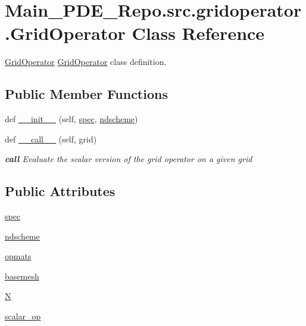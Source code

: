 \hypertarget{classMain__PDE__Repo_1_1src_1_1gridoperator_1_1GridOperator}{}\section{Main\+\_\+\+P\+D\+E\+\_\+\+Repo.\+src.\+gridoperator.\+Grid\+Operator Class Reference}
\label{classMain__PDE__Repo_1_1src_1_1gridoperator_1_1GridOperator}


\hyperlink{classMain__PDE__Repo_1_1src_1_1gridoperator_1_1GridOperator}{Grid\+Operator} \hyperlink{classMain__PDE__Repo_1_1src_1_1gridoperator_1_1GridOperator}{Grid\+Operator} class definition.  


\subsection*{Public Member Functions}
\begin{DoxyCompactItemize}
\item 
def \hyperlink{classMain__PDE__Repo_1_1src_1_1gridoperator_1_1GridOperator_a874aaa760371b08e21431b13fd615dfc}{\+\_\+\+\_\+init\+\_\+\+\_\+} (self, \hyperlink{classMain__PDE__Repo_1_1src_1_1gridoperator_1_1GridOperator_a4fb567c3ca465539b3a726f7532dc0ee}{spec}, \hyperlink{classMain__PDE__Repo_1_1src_1_1gridoperator_1_1GridOperator_aa6270af360bec9b3331951328b48a724}{ndscheme})
\item 
def \hyperlink{classMain__PDE__Repo_1_1src_1_1gridoperator_1_1GridOperator_a9794669e62dbcafb6ecd7e687a5e75b5}{\+\_\+\+\_\+call\+\_\+\+\_\+} (self, grid)
\begin{DoxyCompactList}\small\item\em {\bfseries call} Evaluate the scalar version of the grid operator on a given grid \end{DoxyCompactList}\end{DoxyCompactItemize}
\subsection*{Public Attributes}
\begin{DoxyCompactItemize}
\item 
\hyperlink{classMain__PDE__Repo_1_1src_1_1gridoperator_1_1GridOperator_a4fb567c3ca465539b3a726f7532dc0ee}{spec}
\item 
\hyperlink{classMain__PDE__Repo_1_1src_1_1gridoperator_1_1GridOperator_aa6270af360bec9b3331951328b48a724}{ndscheme}
\item 
\hyperlink{classMain__PDE__Repo_1_1src_1_1gridoperator_1_1GridOperator_aed5a97e2a911c29b47523c6a072e4720}{opmats}
\item 
\hyperlink{classMain__PDE__Repo_1_1src_1_1gridoperator_1_1GridOperator_a1091ae0b853c4ae1b7fdb734dcb7d4af}{basemesh}
\item 
\hyperlink{classMain__PDE__Repo_1_1src_1_1gridoperator_1_1GridOperator_a2d253ceb81a2b90bc7b7e1231aeb79c5}{N}
\item 
\hyperlink{classMain__PDE__Repo_1_1src_1_1gridoperator_1_1GridOperator_ae92052af91aaaefda0465ae51d816100}{scalar\+\_\+op}
\end{DoxyCompactItemize}
